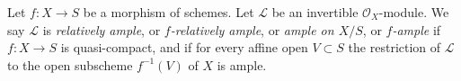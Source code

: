 \begin{definition}
\label{definition-relatively-ample}
\begin{reference}
\cite[II Definition 4.6.1]{EGA}
\end{reference}
Let $f : X \to S$ be a morphism of schemes.
Let $\mathcal{L}$ be an invertible $\mathcal{O}_X$-module.
We say $\mathcal{L}$ is {\it relatively ample}, or {\it $f$-relatively ample},
or {\it ample on $X/S$}, or {\it $f$-ample} if $f : X \to S$
is quasi-compact, and if for every affine open $V \subset S$
the restriction of $\mathcal{L}$ to the open subscheme
$f^{-1}(V)$ of $X$ is ample.
\end{definition}